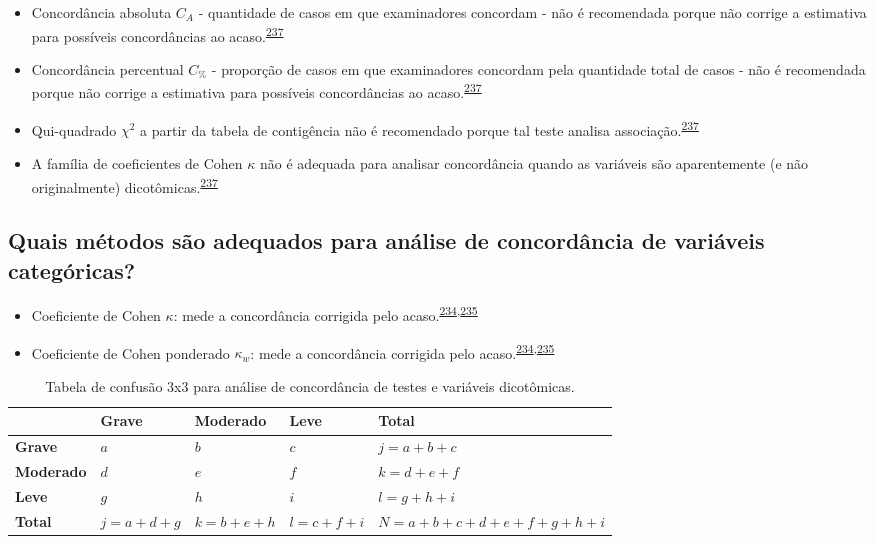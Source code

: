 \documentclass[
  a4paper,
]{book}
\begin{document}
\begin{itemize}
\item
  Concordância absoluta \(C_{A}\) - quantidade de casos em que examinadores concordam - não é recomendada porque não corrige a estimativa para possíveis concordâncias ao acaso.\textsuperscript{\protect\hyperlink{ref-banerjee1999}{237}}
\item
  Concordância percentual \(C_{\%}\) - proporção de casos em que examinadores concordam pela quantidade total de casos - não é recomendada porque não corrige a estimativa para possíveis concordâncias ao acaso.\textsuperscript{\protect\hyperlink{ref-banerjee1999}{237}}
\item
  Qui-quadrado \(\chi^2\) a partir da tabela de contigência não é recomendado porque tal teste analisa associação.\textsuperscript{\protect\hyperlink{ref-banerjee1999}{237}}
\item
  A família de coeficientes de Cohen \(\kappa\) não é adequada para analisar concordância quando as variáveis são aparentemente (e não originalmente) dicotômicas.\textsuperscript{\protect\hyperlink{ref-banerjee1999}{237}}
\end{itemize}

\hypertarget{quais-muxe9todos-suxe3o-adequados-para-anuxe1lise-de-concorduxe2ncia-de-variuxe1veis-categuxf3ricas}{%
\subsection{Quais métodos são adequados para análise de concordância de variáveis categóricas?}\label{quais-muxe9todos-suxe3o-adequados-para-anuxe1lise-de-concorduxe2ncia-de-variuxe1veis-categuxf3ricas}}

\begin{itemize}
\item
  Coeficiente de Cohen \(\kappa\): mede a concordância corrigida pelo acaso.\textsuperscript{\protect\hyperlink{ref-scott1955}{234},\protect\hyperlink{ref-cohen1960}{235}}
\item
  Coeficiente de Cohen ponderado \(\kappa_{w}\): mede a concordância corrigida pelo acaso.\textsuperscript{\protect\hyperlink{ref-scott1955}{234},\protect\hyperlink{ref-cohen1960}{235}}
\end{itemize}

\begin{table}

\caption{\label{tab:crosstable-kappa-3x3}Tabela de confusão 3x3 para análise de concordância de testes e variáveis dicotômicas.}
\centering
\begin{tabu} to 
\toprule
\textbf{ } & \textbf{Grave} & \textbf{Moderado} & \textbf{Leve} & \textbf{Total}\\
\midrule
\textbf{Grave} & $a$ & $b$ & $c$ & $j=a+b+c$\\
\textbf{Moderado} & $d$ & $e$ & $f$ & $k=d+e+f$\\
\textbf{Leve} & $g$ & $h$ & $i$ & $l=g+h+i$\\
\textbf{Total} & $j=a+d+g$ & $k=b+e+h$ & $l=c+f+i$ & $N=a+b+c+d+e+f+g+h+i$\\
\bottomrule
\end{tabu}
\end{table}
\end{document}
